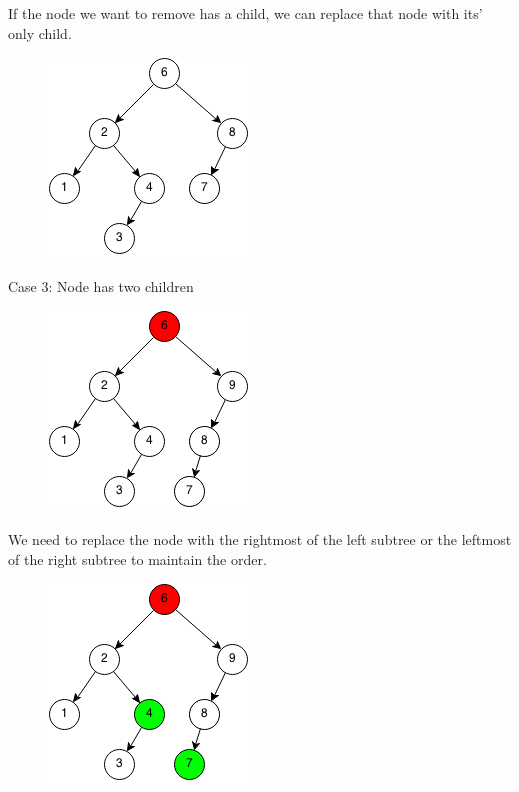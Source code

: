 \documentclass[11pt,oneside]{book}
\makeatletter
\def\maxwidth#1{\ifdim\Gin@nat@width>#1 #1\else\Gin@nat@width\fi}
\makeatother
\begin{document}
If the node we want to remove has a child, we can replace that node with its' only child.

\vspace{5px}\begin{figure}[H]\centering
        \includegraphics[width=0.66\maxwidth{\textwidth}]{bst-rem-case22.png}
        \end{figure}

Case 3: Node has two children

\vspace{5px}\begin{figure}[H]\centering
        \includegraphics[width=0.66\maxwidth{\textwidth}]{bst-rem-case31.png}
        \end{figure}

We need to replace the node with the rightmost of the left subtree or the leftmost of the right subtree to maintain the order.

\vspace{5px}\begin{figure}[H]\centering
        \includegraphics[width=0.66\maxwidth{\textwidth}]{bst-rem-case32.png}
        \end{figure}
\end{document}
